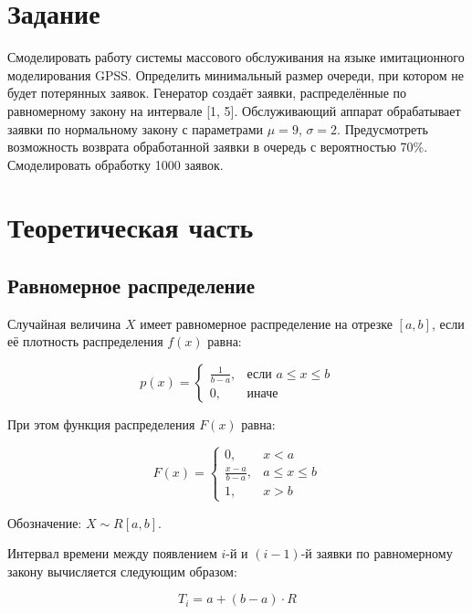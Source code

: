 \section{Задание}

Смоделировать работу системы массового обслуживания на языке имитационного моделирования GPSS. Определить минимальный размер очереди, при котором не будет потерянных заявок. Генератор создаёт заявки, распределённые по равномерному закону на интервале [1, 5]. Обслуживающий аппарат обрабатывает заявки по нормальному закону с параметрами $\mu = 9$, $\sigma = 2$. Предусмотреть возможность возврата обработанной заявки в очередь с вероятностью 70\%. Смоделировать обработку 1000 заявок.

\section{Теоретическая часть}

\subsection{Равномерное распределение}

Случайная величина $X$ имеет равномерное распределение на отрезке $[a, b]$, если её плотность распределения $f(x)$ равна:

\begin{equation}
p(x) = \begin{cases}
\frac{1}{b-a}, & \text{если } a \leq x \leq b \\
0, & \text{иначе}
\end{cases}
\end{equation}

При этом функция распределения $F(x)$ равна:

\begin{equation}
F(x) = \begin{cases}
0, & x < a \\
\frac{x-a}{b-a}, & a \leq x \leq b \\
1, & x > b
\end{cases}
\end{equation}

Обозначение: $X \sim R[a, b]$.

Интервал времени между появлением $i$-й и $(i-1)$-й заявки по равномерному закону вычисляется следующим образом:

\begin{equation}
T_i = a + (b - a) \cdot R
\end{equation}

